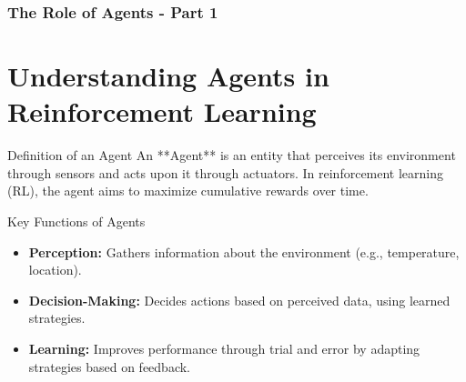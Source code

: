 \documentclass[aspectratio=169]{beamer}
\begin{document}
\begin{frame}[fragile]
    \frametitle{The Role of Agents - Part 1}
    \section{Understanding Agents in Reinforcement Learning}
    
    \begin{block}{Definition of an Agent}
        An **Agent** is an entity that perceives its environment through sensors and acts upon it through actuators. In reinforcement learning (RL), the agent aims to maximize cumulative rewards over time.
    \end{block}

    \begin{block}{Key Functions of Agents}
        \begin{itemize}
            \item \textbf{Perception:} Gathers information about the environment (e.g., temperature, location).
            \item \textbf{Decision-Making:} Decides actions based on perceived data, using learned strategies.
            \item \textbf{Learning:} Improves performance through trial and error by adapting strategies based on feedback.
        \end{itemize}
    \end{block}
\end{frame}
\end{document}
